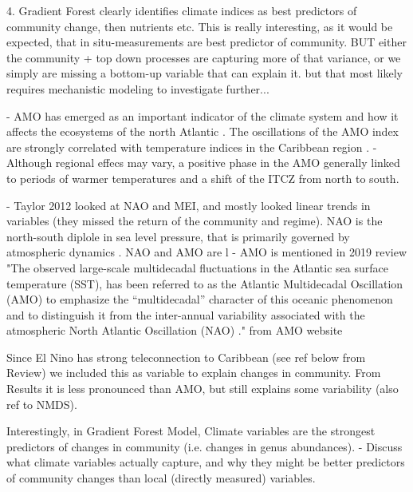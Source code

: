 4. Gradient Forest clearly identifies climate indices as best predictors of community change, then nutrients etc.
    This is really interesting, as it would be expected, that in situ-measurements are best predictor of community. BUT either the community + top down processes are capturing more of that variance, or we simply are missing a bottom-up variable that can explain it.
    but that most likely requires mechanistic modeling to investigate further...

    - AMO has emerged as an important indicator of the climate system and how it affects the ecosystems of the north Atlantic \cite{nye_ecosystem_2014}. The oscillations of the AMO index are strongly correlated with temperature indices in the Caribbean region \cite{stephenson_changes_2014}.
    - Although regional effecs may vary, a positive phase in the AMO generally linked to periods of warmer temperatures and a shift of the ITCZ from north to south.
    
    - Taylor 2012 looked at NAO and MEI, and mostly looked linear trends in variables (they missed the return of the community and regime). NAO is the north-south diplole in sea level pressure, that is primarily governed by atmospheric dynamics \cite{hurrell_north_2009}. NAO and AMO are l
    - AMO is mentioned in 2019 review
    "The observed large-scale multidecadal fluctuations in the Atlantic sea surface temperature (SST), has been referred to as the Atlantic Multidecadal Oscillation (AMO) \cite{kerr2000north} to emphasize the “multidecadal” character of this oceanic phenomenon and to distinguish it from the inter-annual variability associated with the atmospheric North Atlantic Oscillation (NAO) \cite{enfield2001atlantic}." from AMO website

    
    
    Since El Nino has strong teleconnection to Caribbean (see ref below from Review) we included this as variable to explain changes in community. From Results it is less pronounced than AMO, but still explains some variability (also ref to NMDS).

    Interestingly, in Gradient Forest Model, Climate variables are the strongest predictors of changes in community (i.e. changes in genus abundances).
    - Discuss what climate variables actually capture, and why they might be better predictors of community changes than local (directly measured) variables.
    


